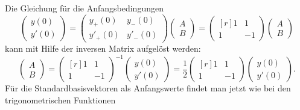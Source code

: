 Die Gleichung für die Anfangsbedingungen 
%
\[
\begin{pmatrix}
 y(0)\\
y'(0)
\end{pmatrix}
=
\begin{pmatrix}
 y_+(0) &  y_-(0) \\
y'_+(0) & y'_-(0) 
\end{pmatrix}
\begin{pmatrix}
A\\B
\end{pmatrix}
=
\begin{pmatrix*}[r]
  1     &    1    \\
  1     &   -1
\end{pmatrix*}
\begin{pmatrix}
A\\B
\end{pmatrix}
\]
kann mit Hilfe der inversen Matrix aufgelöst werden:
\[
\begin{pmatrix}
A\\B
\end{pmatrix}
=
\begin{pmatrix*}[r]
  1     &    1    \\
  1     &   -1
\end{pmatrix*}^{-1}
\begin{pmatrix}
 y(0)\\
y'(0)
\end{pmatrix}
=
\frac12
\begin{pmatrix*}[r]
1&1\\
1&-1
\end{pmatrix*}
\begin{pmatrix}
 y(0)\\
y'(0)
\end{pmatrix}.
\]
Für die Standardbasisvektoren als Anfangswerte findet man jetzt wie bei
den trigonometrischen Funktionen 
